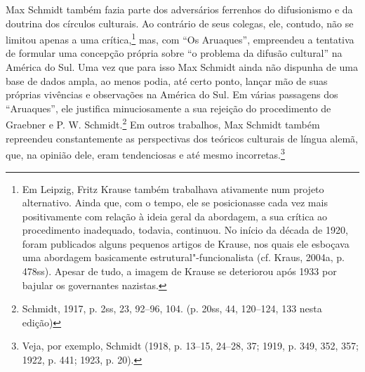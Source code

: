 Max Schmidt também fazia parte dos adversários ferrenhos do
difusionismo e da doutrina dos círculos culturais. Ao contrário de seus
colegas, ele, contudo, não se limitou apenas a uma crítica,\footnote{Em
  Leipzig, Fritz Krause também trabalhava ativamente num projeto
  alternativo. Ainda que, com o tempo, ele se posicionasse cada vez mais
  positivamente com relação à ideia geral da abordagem, a sua crítica ao
  procedimento inadequado, todavia, continuou. No início da década de
  1920, foram publicados alguns pequenos artigos de Krause, nos quais
  ele esboçava uma abordagem basicamente estrutural"-funcionalista (cf.
  Kraus, 2004a, p. 478ss). Apesar de tudo, a imagem de Krause se
  deteriorou após 1933 por bajular os governantes nazistas.} mas, com
``Os Aruaques'', empreendeu a tentativa de formular uma concepção
própria sobre ``o problema da difusão cultural'' na América do Sul. Uma
vez que para isso Max Schmidt ainda não dispunha de uma base de dados
ampla, ao menos podia, até certo ponto, lançar mão de suas próprias
vivências e observações na América do Sul. Em várias passagens dos
``Aruaques'', ele justifica minuciosamente a sua rejeição do
procedimento de Graebner e P. W. Schmidt.\footnote{Schmidt, 1917, p.
  2ss, 23, 92--96, 104. (p. 20ss, 44, 120--124, 133 nesta edição)} Em
outros trabalhos, Max Schmidt também repreendeu constantemente as
perspectivas dos teóricos culturais de língua alemã, que, na opinião
dele, eram tendenciosas e até mesmo incorretas.\footnote{Veja, por
  exemplo, Schmidt (1918, p. 13--15, 24--28, 37; 1919, p. 349, 352, 357;
  1922, p. 441; 1923, p. 20).}


